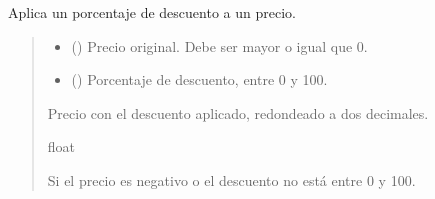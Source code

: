 \documentclass[letterpaper,10pt,spanish]{sphinxmanual}
\begin{document}
\begin{fulllineitems}
\label{\detokenize{calculadora:calculadora.aplicar_descuento}}
\pysigstartsignatures
\pysiglinewithargsret
{}
{\sphinxparamcomma {}}
{}
\pysigstopsignatures
\sphinxAtStartPar
Aplica un porcentaje de descuento a un precio.
\begin{quote}\begin{description}
\begin{itemize}
\item {} 
\sphinxAtStartPar
{} () \textendash{} Precio original. Debe ser mayor o igual que 0.

\item {} 
\sphinxAtStartPar
{} () \textendash{} Porcentaje de descuento, entre 0 y 100.

\end{itemize}

\sphinxAtStartPar
Precio con el descuento aplicado, redondeado a dos decimales.

\sphinxAtStartPar
float

\sphinxAtStartPar
{} \textendash{} Si el precio es negativo o el descuento no está
entre 0 y 100.

\end{description}\end{quote}

\end{fulllineitems}

\end{document}
